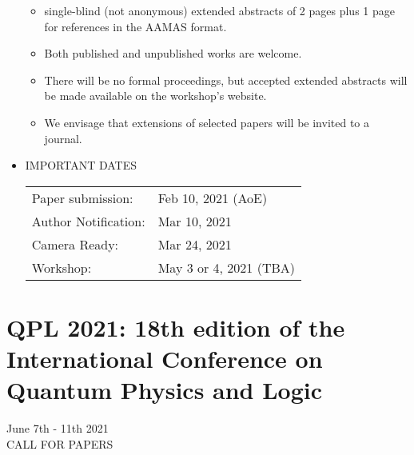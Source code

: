 \documentclass{article}
\begin{document}
\begin{itemize}
\begin{itemize}\item  single-blind (not anonymous) extended abstracts of 2 pages plus 1 page for references in the AAMAS format.
\item  Both published and unpublished works are welcome.
\item  There will be no formal proceedings, but accepted extended abstracts will be made available on the workshop's website.
\item  We envisage that extensions of selected papers will be invited to a journal.
\end{itemize} 
\item  IMPORTANT DATES 
 
\begin{tabulary}{\linewidth}{LL}Paper submission:  & Feb 10, 2021 (AoE) \\
Author Notification:  & Mar 10, 2021 \\
Camera Ready:  & Mar 24, 2021 \\
Workshop:  & May 3 or 4, 2021 (TBA) \\
\end{tabulary}
 
\end{itemize}\section{QPL 2021: 18th edition of the International Conference on Quantum Physics and Logic}\label{QPL2021}  June 7th - 11th 2021\\ 
CALL FOR PAPERS 
\end{document}
